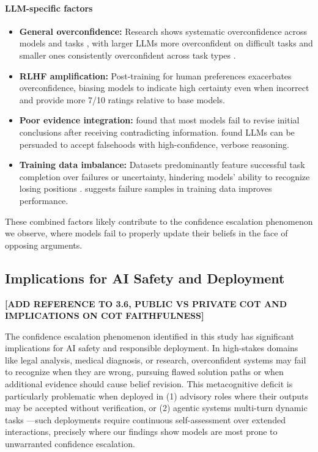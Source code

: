 \documentclass{article}
\begin{document}
\paragraph{LLM-specific factors}
\begin{itemize}
    \item \textbf{General overconfidence:} Research shows systematic overconfidence across models and tasks \citep{chhikara2025mindconfidencegapoverconfidence,xiong2024uncertainty}, with larger LLMs more overconfident on difficult tasks and smaller ones consistently overconfident across task types \citep{wen2024from}.

    \item \textbf{RLHF amplification:} Post-training for human preferences exacerbates overconfidence, biasing models to indicate high certainty even when incorrect \citep{leng2025tamingoverconfidencellmsreward} and provide more 7/10 ratings \citep{west2025basemodelsbeataligned,openai2024gpt4technicalreport} relative to base models.

    \item \textbf{Poor evidence integration:} \citet{wilie2024beliefrevisionadaptabilitylarge} found that most models fail to revise initial conclusions after receiving contradicting information. \citet{agarwal2025persuasionoverridestruthmultiagent} found LLMs can be persuaded to accept falsehoods with high-confidence, verbose reasoning.

    \item \textbf{Training data imbalance:} Datasets predominantly feature successful task completion over failures or uncertainty, hindering models' ability to recognize losing positions \citep{zhou2023navigatinggreyareaexpressions}. \citet{chung2025learningfailuresmultiattemptreinforcement} suggests failure samples in training data improves performance.
\end{itemize}

These combined factors likely contribute to the confidence escalation phenomenon we observe, where models fail to properly update their beliefs in the face of opposing arguments.

\subsection{Implications for AI Safety and Deployment}

\textbf{[ADD REFERENCE TO 3.6, PUBLIC VS PRIVATE COT AND IMPLICATIONS ON COT FAITHFULNESS]}

The confidence escalation phenomenon identified in this study has significant implications for AI safety and responsible deployment. In high-stakes domains like legal analysis, medical diagnosis, or research, overconfident systems may fail to recognize when they are wrong, pursuing flawed solution paths or when additional evidence should cause belief revision. This metacognitive deficit is particularly problematic when deployed in (1) advisory roles where their outputs may be accepted without verification, or (2) agentic systems multi-turn dynamic tasks —such deployments require continuous self-assessment over extended interactions, precisely where our findings show models are most prone to unwarranted confidence escalation.
\end{document}
